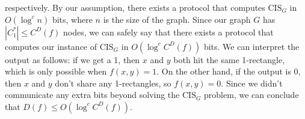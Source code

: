 \documentclass{article}
\begin{document}
\begin{enumerate}
\begin{enumerate}[label=(\alph*)]
                respectively. By our assumption, there exists a protocol that
                computes $\textrm{CIS}_G$ in $O(\log^c n)$ bits, where $n$ is
                the size of the graph. Since our graph $G$ has $|C^*_1| \leq
                C^D(f)$ nodes, we can safely say that there exists a protocol
                that computes our instance of $\textrm{CIS}_G$ in $O(\log^c
                C^D(f))$ bits. We can interpret the output as follows: if we
                get a 1, then $x$ and $y$ both hit the same 1-rectangle, which
                is only possible when $f(x,y) = 1$. On the other hand, if the
                output is 0, then $x$ and $y$ don't share any 1-rectangles,
                so $f(x,y) = 0$. Since we didn't communicate any extra bits
                beyond solving the $\textrm{CIS}_G$ problem, we can conclude
                that $D(f) \leq O(\log^c C^D(f))$.
                \\
        \end{enumerate}

\end{enumerate}
\end{document}
